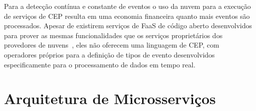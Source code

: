 Para a detecção contínua e constante de eventos o uso da nuvem para a execução de serviços de CEP resulta em uma economia financeira quanto mais eventos são processados. Apesar de existirem serviços de FaaS de código aberto desenvolvidos para prover as mesmas funcionalidades que os serviços proprietários dos provedores de nuvens~\citep{Knative,Kubeless,OpenFaaS,Serverless}, eles não oferecem uma linguagem de CEP, com operadores próprios para a definição de tipos de evento desenvolvidos especificamente para o processamento de dados em tempo real.


\section{Arquitetura de Microsserviços}
\label{sec:microservicearquitecture}

